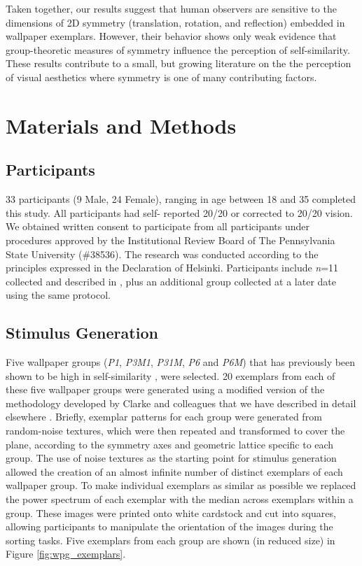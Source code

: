 \documentclass[11pt, twoside]{article}
\begin{document}
Taken together, our results suggest that human observers are sensitive to the dimensions of 2D symmetry (translation, rotation, and reflection) embedded in wallpaper exemplars. However, their behavior shows only weak evidence that group-theoretic measures of symmetry influence the perception of self-similarity. These results contribute to a small, but growing literature on the the perception of visual aesthetics \citep{Carneiro2012-ph,Graham2010-yf,Friedenberg2012-gf,Laine-Hernandez2008-sg,Richards1972-gl} where symmetry is one of many contributing factors.

\section*{Materials and Methods}
\label{methods}

\subsection*{Participants}
33 participants (9 Male, 24 Female), ranging in age between 18 and 35 completed this study. All participants had self- reported 20/20 or corrected to 20/20 vision. We obtained written consent to participate from all participants under procedures approved by the Institutional Review Board of The Pennsylvania State University (\#38536). The research was conducted according to the principles expressed in the Declaration of Helsinki. Participants include \textit{n}=11 collected and described in \citep{vedak_thesis}, plus an additional group collected at a later date using the same protocol.

\subsection*{Stimulus Generation}
Five wallpaper groups (\textit{P1}, \textit{P3M1}, \textit{P31M}, \textit{P6} and \textit{P6M}) that has previously been shown to be high in self-similarity \citep{RN172}, were selected. 20 exemplars from each of these five wallpaper groups were generated using a modified version of the methodology developed by Clarke and colleagues \citep{RN172} that we have described in detail elsewhere \citep{RN1725}. Briefly, exemplar patterns for each group were generated from random-noise textures, which were then repeated and transformed to cover the plane, according to the symmetry axes and geometric lattice specific to each group. The use of noise textures as the starting point for stimulus generation allowed the creation of an almost infinite number of distinct exemplars of each wallpaper group. To make individual exemplars as similar as possible we replaced the power spectrum of each exemplar with the median across exemplars within a group. These images were printed onto white cardstock and cut into squares, allowing participants to manipulate the orientation of the images during the sorting tasks. Five exemplars from each group are shown (in reduced size) in Figure \ref{fig:wpg_exemplars}. 
\end{document}
